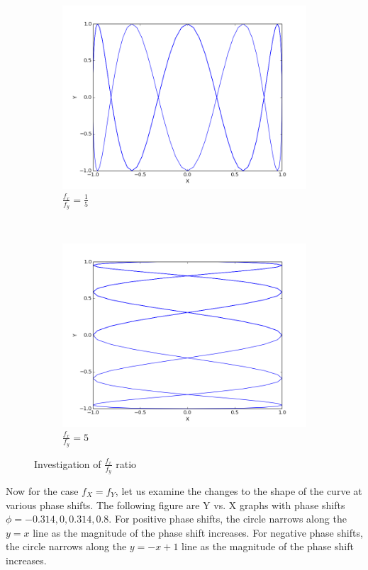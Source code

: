 \documentclass{article}
\begin{document}
\begin{enumerate}
	\begin{figure}[h]
		\centering
		\begin{subfigure}{0.4\textwidth}
		\centering
		\includegraphics[width=0.9\linewidth]{fig5.png}
		\caption{$\frac{f_x}{f_y} = \frac{1}{5}$}
		\end{subfigure}
		~
		\begin{subfigure}{0.4\textwidth}
		\centering
		\includegraphics[width=0.9\linewidth]{fig6.png}
		\caption{$\frac{f_x}{f_y} = 5$}
		\end{subfigure}
		
		\caption{Investigation of $\frac{f_x}{f_y}$ ratio}
	\end{figure}
	
	Now for the case $f_X = f_Y$, let us examine the changes to the shape of the curve at various phase shifts. The following figure are Y vs. X graphs with phase shifts $\phi = -0.314, 0, 0.314, 0.8$. For positive phase shifts, the circle narrows along the $y = x$ line as the magnitude of the phase shift increases. For negative phase shifts, the circle narrows along the $y = -x + 1$ line as the magnitude of the phase shift increases. 
	

\end{enumerate}
\end{document}

